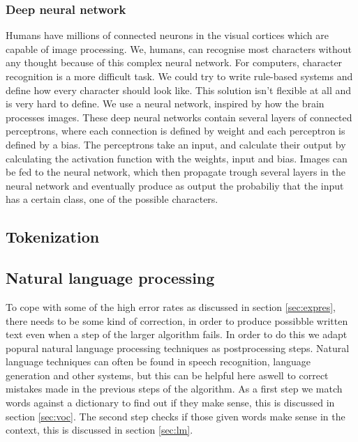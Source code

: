 \documentclass{article}
\begin{document}
\subsubsection{Deep neural network}
\label{sec:dnn}
Humans have millions of connected neurons in the visual cortices which are capable of image processing. We, humans, can recognise most characters without any thought because of this complex neural network. For computers, character recognition is a more difficult task. We could try to write rule-based systems and define how every character should look like. This solution isn't flexible at all and is very hard to define. We use a neural network, inspired by how the brain processes images. These deep neural networks contain several layers of connected perceptrons, where each connection is defined by weight and each perceptron is defined by a bias. The perceptrons take an input, and calculate their output by calculating the activation function with the weights, input and bias. Images can be fed to the neural network, which then propagate trough several layers in the neural network and eventually produce as output the probabiliy that the input has a certain class, one of the possible characters. 

\subsection{Tokenization}

\subsection{Natural language processing}
To cope with some of the high error rates as discussed in section \ref{sec:expres}, there needs to be some kind of correction, in order to produce possibble written text even when a step of the larger algorithm fails. In order to do this we adapt popural natural language processing techniques as postprocessing steps. Natural language techniques can often be found in speech recognition, language generation and other systems, but this can be helpful here aswell to correct mistakes made in the previous steps of the algorithm. As a first step we match words against a dictionary to find out if they make sense, this is discussed in section \ref{sec:voc}. The second step checks if those given words make sense in the context, this is discussed in section \ref{sec:lm}.
\end{document}

